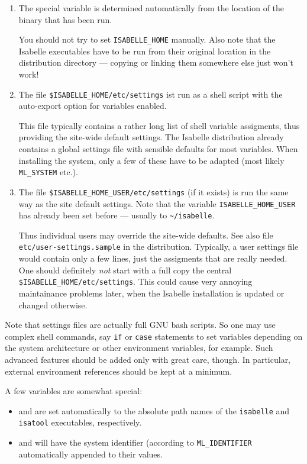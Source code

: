 \begin{enumerate}
\item The special variable  is determined
  automatically from the location of the binary that has been run.

  You should not try to set \texttt{ISABELLE_HOME} manually. Also note
  that the Isabelle executables have to be run from their original
  location in the distribution directory --- copying or linking them
  somewhere else just won't work!

\item The file \texttt{\$ISABELLE_HOME/etc/settings} ist run as a
  shell script with the auto-export option for variables enabled.

  This file typically contains a rather long list of shell variable
  assigments, thus providing the site-wide default settings.  The
  Isabelle distribution already contains a global settings file with
  sensible defaults for most variables. When installing the system,
  only a few of these have to be adapted (most likely
  \texttt{ML_SYSTEM} etc.).
  
\item The file \texttt{\$ISABELLE_HOME_USER/etc/settings} (if it exists) is
  run the same way as the site default settings. Note that the variable
  \texttt{ISABELLE_HOME_USER} has already been set before --- usually to
  \texttt{\~\relax/isabelle}.

  Thus individual users may override the site-wide defaults. See also
  file \texttt{etc/user-settings.sample} in the distribution.
  Typically, a user settings file would contain only a few lines, just
  the assigments that are really needed.  One should definitely
  \emph{not} start with a full copy the central
  \texttt{\$ISABELLE_HOME/etc/settings}. This could cause very
  annoying maintainance problems later, when the Isabelle installation
  is updated or changed otherwise.

\end{enumerate}

Note that settings files are actually full GNU bash scripts. So one
may use complex shell commands, say \texttt{if} or \texttt{case}
statements to set variables depending on the system architecture or
other environment variables, for example. Such advanced features
should be added only with great care, though. In particular, external
environment references should be kept at a minimum.

\medskip A few variables are somewhat special:
\begin{itemize}
\item {} and  are set automatically to
  the absolute path names of the \texttt{isabelle} and
  \texttt{isatool} executables, respectively.
  
\item {} and  will have the {\ML}
  system identifier (according to \texttt{ML_IDENTIFIER} automatically
  appended to their values.
\end{itemize}

